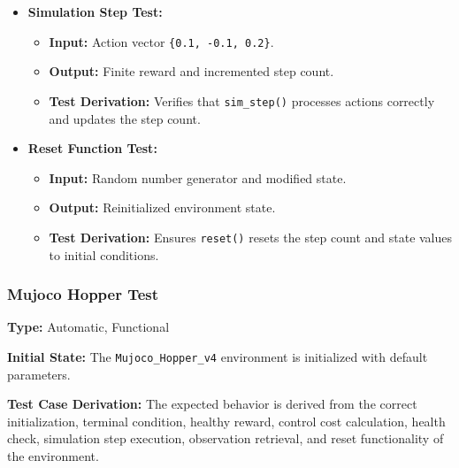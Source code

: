\documentclass[12pt, titlepage]{article}
\begin{document}
\begin{itemize}
    \item \textbf{Simulation Step Test:}
    \begin{itemize}
        \item \textbf{Input:} Action vector \texttt{\{0.1, -0.1, 0.2\}}.
        \item \textbf{Output:} Finite reward and incremented step count.
        \item \textbf{Test Derivation:} Verifies that \texttt{sim\_step()} processes actions correctly and updates the step count.
    \end{itemize}

    \item \textbf{Reset Function Test:}
    \begin{itemize}
        \item \textbf{Input:} Random number generator and modified state.
        \item \textbf{Output:} Reinitialized environment state.
        \item \textbf{Test Derivation:} Ensures \texttt{reset()} resets the step count and state values to initial conditions.
    \end{itemize}
\end{itemize}


\subsubsection{Mujoco Hopper Test\\}

\textbf{Type:} Automatic, Functional

\textbf{Initial State:} The \texttt{Mujoco\_Hopper\_v4} environment is initialized with default parameters.

\textbf{Test Case Derivation:} The expected behavior is derived from the correct initialization, terminal condition, healthy reward, control cost calculation, health check, simulation step execution, observation retrieval, and reset functionality of the environment.
\end{document}
